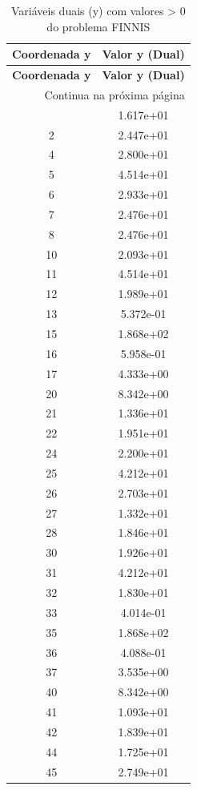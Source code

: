 \documentclass[12pt]{article}
\begin{document}
\begin{longtable}{@{}cc@{}}
\caption{Variáveis duais (y) com valores > 0 do problema FINNIS} \\
\toprule
\textbf{Coordenada y} & \textbf{Valor y (Dual)} \\
\midrule
\endfirsthead

\toprule
\textbf{Coordenada y} & \textbf{Valor y (Dual)} \\
\midrule
\endhead

\midrule \multicolumn{2}{r}{{Continua na próxima página}} \\ \midrule
\endfoot

\bottomrule
\endlastfoot
1 & 1.617e+01 \\
2 & 2.447e+01 \\
4 & 2.800e+01 \\
5 & 4.514e+01 \\
6 & 2.933e+01 \\
7 & 2.476e+01 \\
8 & 2.476e+01 \\
10 & 2.093e+01 \\
11 & 4.514e+01 \\
12 & 1.989e+01 \\
13 & 5.372e-01 \\
15 & 1.868e+02 \\
16 & 5.958e-01 \\
17 & 4.333e+00 \\
20 & 8.342e+00 \\
21 & 1.336e+01 \\
22 & 1.951e+01 \\
24 & 2.200e+01 \\
25 & 4.212e+01 \\
26 & 2.703e+01 \\
27 & 1.332e+01 \\
28 & 1.846e+01 \\
30 & 1.926e+01 \\
31 & 4.212e+01 \\
32 & 1.830e+01 \\
33 & 4.014e-01 \\
35 & 1.868e+02 \\
36 & 4.088e-01 \\
37 & 3.535e+00 \\
40 & 8.342e+00 \\
41 & 1.093e+01 \\
42 & 1.839e+01 \\
44 & 1.725e+01 \\
45 & 2.749e+01 \\

\end{longtable}
\end{document}
